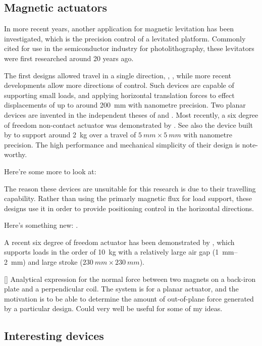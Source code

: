\subsection{Magnetic actuators}

In more recent years, another application for magnetic
levitation has been investigated, which is the precision
control of a levitated platform.  Commonly cited for use in
the semiconductor industry for photolithography, these
levitators were first researched around 20 years ago.

The first designs allowed travel in a single direction, \eg,
\textcite{trumper1992}, while more recent developments allow
more directions of control.  Such devices are capable of
supporting small loads, and applying horizontal translation
forces to effect displacements of up to around \SI{200}{mm}
with nanometre precision. Two planar devices are invented in
the independent theses of \textcite{kim1997} and
\textcite{molenaar2000}. Most recently, a six degree of
freedom non-contact actuator was demonstrated by
\textcite{verma2004}. See also the device built by
\textcite{kim2007} to support around \SI{2}{kg} over a travel
of $\SI{5}{mm}\times\SI{5}{mm}$ with nanometre precision. The
high performance and mechanical simplicity of their design is
note-worthy.

Here're some more to look at: \textcite{boeij2008,zhang2008a}

The reason these devices are unsuitable for this research is
due to their travelling capability. Rather than using the
primarly magnetic flux for load support, these designs use it
in order to provide positioning control in the horizontal
directions.

Here's something new: \textcite{shameli2008}.

A recent six degree of freedom actuator has been demonstrated
by \textcite{jansen2008}, which supports loads in the order of
\SI{10}{kg} with a relatively large air gap (\SI{1}{mm}--\SI{2}{mm}) 
and large stroke ($\SI{230}{mm}\times\SI{230}{mm}$).

[\textcite{dasilveira2005}] Analytical expression for the normal force
between two magnets on a back-iron plate and a perpendicular coil. The system
is for a planar actuator, and the motivation is to be able to determine the
amount of out-of-plane force generated by a particular design. Could very well
be useful for some of my ideas.

\subsection{Interesting devices}

